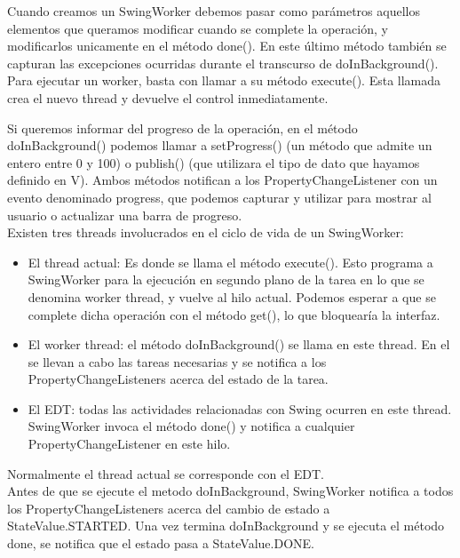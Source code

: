 \documentclass[12pt, a4paper]{article}
\begin{document}
 Cuando creamos un SwingWorker debemos pasar como parámetros aquellos elementos que queramos modificar cuando se complete la operación, y modificarlos unicamente en el método done(). En este último método también se capturan las excepciones ocurridas durante el transcurso de doInBackground().\\
 
 Para ejecutar un worker, basta con llamar a su método execute(). Esta llamada crea el nuevo thread y devuelve el control inmediatamente.
 
 \newpage
 
Si queremos informar del progreso de la operación, en el método doInBackground() podemos llamar a setProgress() (un método que admite un entero entre 0 y 100) o publish() (que utilizara el tipo de dato que hayamos definido en V). Ambos métodos notifican a los PropertyChangeListener con un evento denominado progress, que podemos capturar y utilizar para mostrar al usuario o actualizar una barra de progreso.\\


Existen tres threads involucrados en el ciclo de vida de un SwingWorker:

\begin{itemize}
	\item El thread actual: Es donde se llama el método execute(). Esto programa a SwingWorker para la ejecución en segundo plano de la tarea en lo que se denomina worker thread, y vuelve al hilo actual. Podemos esperar a que se complete dicha operación con el método get(), lo que bloquearía la interfaz.
	\item El worker thread: el método doInBackground() se llama en este thread. En el se llevan a cabo las tareas necesarias y se notifica a los PropertyChangeListeners acerca del estado de la tarea.
	\item El \gls{EDT}: todas las actividades relacionadas con Swing ocurren en este thread. SwingWorker invoca el método done() y notifica a cualquier PropertyChangeListener en este hilo.
\end{itemize}

Normalmente el thread actual se corresponde con el \gls{EDT}.\\

Antes de que se ejecute el metodo doInBackground, SwingWorker notifica a todos los PropertyChangeListeners acerca del cambio de estado a StateValue.STARTED. Una vez termina doInBackground y se ejecuta el método done, se notifica que el estado pasa a StateValue.DONE.\\
\end{document}
